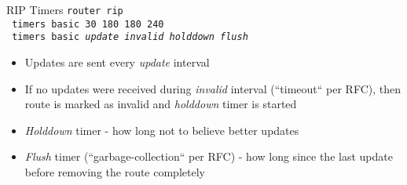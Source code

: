 \begin{frame}{RIP Timers}
	\texttt{router rip
		\\~timers basic 30 180 180 240
		\\~timers basic \textit{update invalid holddown flush}
	}\pause
	\begin{itemize}[<+->]
		\item Updates are sent every \textit{update} interval
		\item If no updates were received during \textit{invalid} interval (``timeout`` per RFC), then route is marked as invalid and \textit{holddown} timer is started
		\item \textit{Holddown} timer - how long not to believe better updates
		\item \textit{Flush} timer (``garbage-collection`` per RFC) - how long since the last update before removing the route completely
	\end{itemize}
\end{frame}
